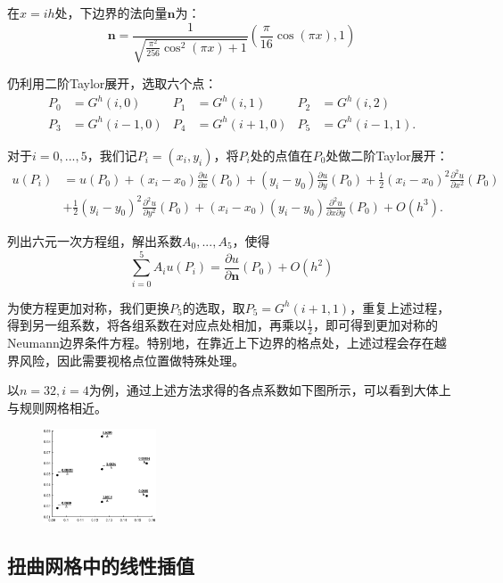 \documentclass[lang=cn,10pt]{elegantbook}
\begin{document}
在$x=ih$处，下边界的法向量$\mathbf{n}$为：
\begin{equation}
  \mathbf{n}=\frac{1}{\sqrt{\frac{\pi^2}{256}\cos^2(\pi x)+1}}\left(\frac{\pi}{16}\cos(\pi x),1\right)
\end{equation}

仍利用二阶Taylor展开，选取六个点：
\begin{align*}
  P_0&=G^h(i,0) & P_1&=G^h(i,1) & P_2&=G^h(i,2)\\
  P_3&=G^h(i-1,0) & P_4&=G^h(i+1,0) & P_5&=G^h(i-1,1).
\end{align*}

对于$i=0,...,5$，我们记$P_i=(x_i,y_i)$，将$P_i$处的点值在$P_0$处做二阶Taylor展开：
\begin{align*}
  u(P_i)&=u(P_0)+(x_i-x_0)\frac{\partial u}{\partial x}(P_0)+(y_i-y_0)\frac{\partial u}{\partial y}(P_0)
  +\frac{1}{2}(x_i-x_0)^2\frac{\partial^2 u}{\partial x^2}(P_0) \\
  & +\frac{1}{2}(y_i-y_0)^2\frac{\partial^2 u}{\partial y^2}(P_0)
  +(x_i-x_0)(y_i-y_0)\frac{\partial^2 u}{\partial x \partial y}(P_0)+O(h^3).
\end{align*}

列出六元一次方程组，解出系数$A_0,...,A_5$，使得
\begin{equation*}
  \sum_{i=0}^5 A_iu(P_i)=\frac{\partial u}{\partial \mathbf{n}}(P_0)+O(h^2)
\end{equation*}

为使方程更加对称，我们更换$P_5$的选取，取$P_5=G^h(i+1,1)$，重复上述过程，得到另一组系数，将各组系数在对应点处相加，再乘以$\frac{1}{2}$，即可得到更加对称的Neumann边界条件方程。特别地，在靠近上下边界的格点处，上述过程会存在越界风险，因此需要视格点位置做特殊处理。

以$n=32,i=4$为例，通过上述方法求得的各点系数如下图所示，可以看到大体上与规则网格相近。

\begin{figure}[H]
  \centering
  \includegraphics[width=0.3\textwidth]{figure/3-4.eps}
\end{figure}

\subsection{扭曲网格中的线性插值}
\end{document}
